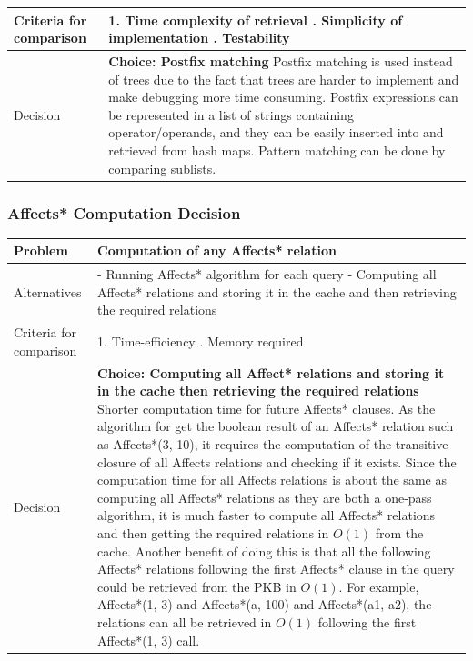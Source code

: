 \documentclass[12pt]{article}
\begin{document}
{{{{{{{{{{{{{\begin{tabular}{|L{5cm} | L{12cm}| }
 \\
\hline
    Criteria for comparison &
1. Time complexity of retrieval
. Simplicity of implementation
. Testability
 \\
 \hline
   Decision & \textbf{Choice:  Postfix matching}
\newline
Postfix matching is used instead of trees due to the fact that trees are harder to implement and make debugging more time consuming. Postfix expressions can be represented in a list of strings containing operator/operands, and they can be easily inserted into and retrieved from hash maps. Pattern matching can be done by comparing sublists.
 \\
 \hline
\end{tabular}

\subsubsection{Affects* Computation Decision
}
\begin{tabular}{|L{5cm} | L{12cm}| }
\hline
Problem &
Computation of any Affects* relation
 \\
    \hline
    Alternatives &
- Running Affects* algorithm for each query
\newline - Computing all Affects* relations and storing it in the cache and then retrieving the required relations


 \\
\hline
    Criteria for comparison &
1. Time-efficiency
. Memory required
 \\
 \hline
   Decision & \textbf{Choice:  Computing all Affect* relations and storing it in the cache then retrieving the required relations}
\newline
Shorter computation time for future Affects* clauses.
\newline
As the algorithm for get the boolean result of an Affects* relation such as Affects*(3, 10), it requires the computation of the transitive closure of all Affects relations and checking if it exists. Since the computation time for all Affects relations is about the same as computing all Affects* relations as they are both a one-pass algorithm, it is much faster to compute all Affects* relations and then getting the required relations in $O(1)$ from the cache. Another benefit of doing this is that all the following Affects* relations following the first Affects* clause in the query could be retrieved from the PKB in $O(1)$. For example, Affects*(1, 3) and Affects*(a, 100) and Affects*(a1, a2), the relations can all be retrieved in $O(1)$ following the first Affects*(1, 3) call.


\end{tabular}}}}}}}}}}}}}}
\end{document}
